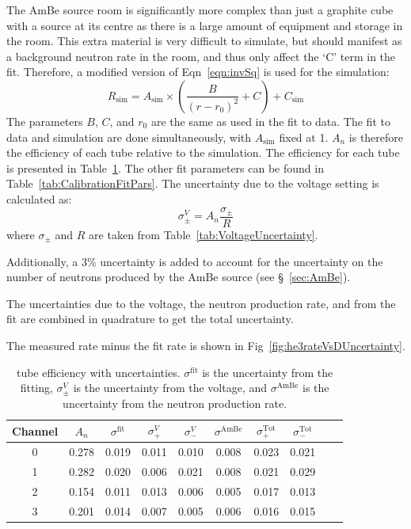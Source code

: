 The AmBe source room is significantly more complex than just a graphite cube with a source at its centre as there is a large amount of equipment and storage in the room. This extra material is very difficult to simulate, but should manifest as a background neutron rate in the room, and thus only affect the `C' term in the fit. Therefore, a modified version of Eqn~\ref{eqn:invSq} is used for the simulation:
\begin{equation}
	{R_{\mathrm{sim}} = A_{\mathrm{sim}}\times\left(\frac{B}{(r-r_{0})^2} + C\right)+C_{\mathrm{sim}}}
\end{equation}	
The parameters $B$, $C$, and $r_0$ are the same as used in the fit to data. The fit to data and simulation are done simultaneously, with $A_{\mathrm{sim}}$ fixed at 1. $A_{n}$ is therefore the efficiency of each tube relative to the simulation. The efficiency for each \he tube is presented in Table~\ref{tab:he3Calib}.  The other fit parameters can be found in Table~\ref{tab:CalibrationFitPars}. The uncertainty due to the voltage setting is calculated as:
\begin{equation}
	{\sigma_{\pm}^V = A_{n}\frac{\sigma_{\pm}}{R}}
\end{equation}
where $\sigma_{\pm}$ and $R$ are taken from Table~\ref{tab:VoltageUncertainty}. 

Additionally, a 3\% uncertainty is added to account for the uncertainty on the number of neutrons produced by the AmBe source (see \S~\ref{sec:AmBe}).

The uncertainties due to the voltage, the neutron production rate, and from the fit are combined in quadrature to get the total uncertainty.

The measured rate minus the fit rate is shown in Fig~\ref{fig:he3rateVsDUncertainty}.

\begin{table}[htb]
	\centering
	\begin{tabular}{ cccccccccc}
Channel	&	$A_{n}$	&	$\sigma^{\mathrm{fit}}$	&	$\sigma_{+}^{V}$	&	$\sigma_{-}^{V}$	&	$\sigma^{\mathrm{AmBe}}$&		$\sigma_{+}^{\mathrm{Tot}}$	&	$\sigma_{-}^{\mathrm{Tot}}$	\\	\hline	\hline
0	&	0.278	&	0.019	&	0.011	&	0.010	&	0.008	&	0.023	&	0.021	\\		
1	&	0.282	&	0.020	&	0.006	&	0.021	&	0.008	&	0.021	&	0.029	\\		
2	&	0.154	&	0.011	&	0.013	&	0.006	&	0.005	&	0.017	&	0.013	\\		
3	&	0.201	&	0.014	&	0.007	&	0.005	&	0.006	&	0.016	&	0.015	\\	\hline	
	


	\end{tabular}
	\caption[\He tube efficiency with uncertainties]{\He tube efficiency with uncertainties. $\sigma^{\mathrm{fit}}$ is the uncertainty from the fitting, $\sigma_{\pm}^{V}$ is the uncertainty from the voltage, and $\sigma^{\mathrm{AmBe}}$ is the uncertainty from the neutron production rate.}
	\label{tab:he3Calib}
\end{table}

